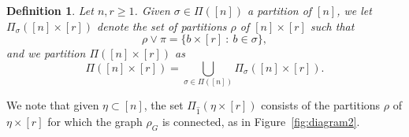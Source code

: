 \documentclass[12pt]{article}
\newtheorem{definition}[prop]{Definition}
\numberwithin{equation}{section}
\begin{document}
\vspace{-0.4cm}
  
\begin{definition}
 Let $n , r \geq 1$. 
 Given $\sigma \in \Pi ([n] )$ a partition of $[n]$, 
 we let $\Pi_\sigma ( [n] \times [r])$ denote the set of
 partitions $\rho$ of $[n] \times [r]$ such that
 $$
 \rho\vee\pi= \{ b \times [r] \ : \ b \in \sigma \}, 
 $$
 and %
 we partition $\Pi ([n] \times [r])$ as
\begin{equation}
\label{partition} 
 \Pi ([n] \times [r])
 = \bigcup_{\sigma \in \Pi ([n] )} \Pi_\sigma ([n] \times [r]). 
\end{equation} 
\end{definition}
 We note that given $\eta \subset [n]$,
the set $\Pi_{\widehat{1}} ( \eta \times [r])$ consists of the partitions
$\rho$ of $\eta \times [r]$ for which the graph $\rho_G$
is connected, as in Figure~\ref{fig:diagram2}. 

\end{document}
